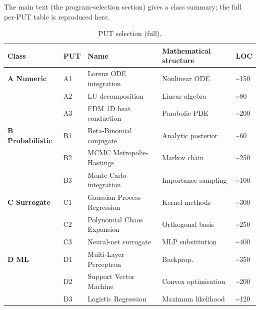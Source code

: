 \documentclass[manuscript,screen,review]{acmart}
\begin{document}
The main text (the program-selection section) gives a class
summary; the full per-PUT table is reproduced here.

{%
\small
\begin{longtable}[]{@{}
  >{\raggedright\arraybackslash}p{}
  >{\raggedright\arraybackslash}p{}
  >{\raggedright\arraybackslash}p{}
  >{\raggedright\arraybackslash}p{}
  >{\raggedright\arraybackslash}p{}@{}}
\caption{PUT selection (full).}\label{tab:p2-02-full}\\
\toprule\noalign{}
Class & PUT & Name & Mathematical structure & LOC \\
\midrule\noalign{}
\endfirsthead
\endhead
\bottomrule\noalign{}
\endlastfoot
\textbf{A Numeric} & A1 & Lorenz ODE integration & Nonlinear ODE &
\textasciitilde150 \\
& A2 & LU decomposition & Linear algebra & \textasciitilde80 \\
& A3 & FDM 1D heat conduction & Parabolic PDE & \textasciitilde200 \\
\textbf{B Probabilistic} & B1 & Beta-Binomial conjugate & Analytic
posterior & \textasciitilde60 \\
& B2 & MCMC Metropolis-Hastings & Markov chain & \textasciitilde250 \\
& B3 & Monte Carlo integration & Importance sampling &
\textasciitilde100 \\
\textbf{C Surrogate} & C1 & Gaussian Process Regression & Kernel methods
& \textasciitilde300 \\
& C2 & Polynomial Chaos Expansion & Orthogonal basis &
\textasciitilde250 \\
& C3 & Neural-net surrogate & MLP substitution & \textasciitilde400 \\
\textbf{D ML} & D1 & Multi-Layer Perceptron & Backprop. &
\textasciitilde350 \\
& D2 & Support Vector Machine & Convex optimisation &
\textasciitilde200 \\
& D3 & Logistic Regression & Maximum likelihood & \textasciitilde120 \\
\end{longtable}
}



\end{document}
